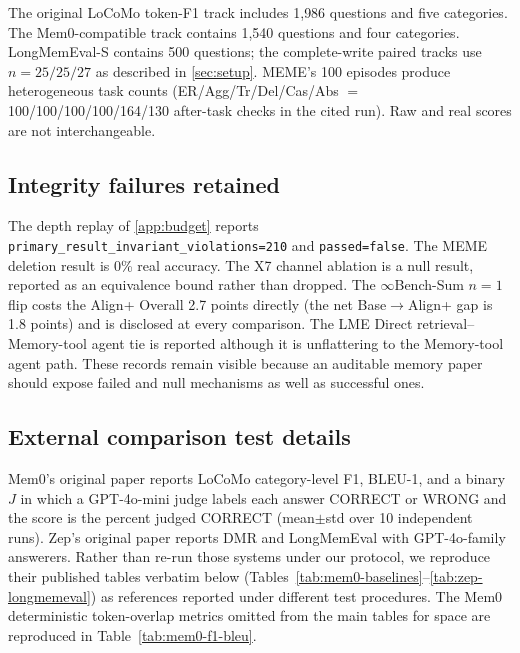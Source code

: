 The original LoCoMo token-F1 track includes 1{,}986 questions and five categories. The Mem0-compatible track contains 1{,}540 questions and four categories. LongMemEval-S contains 500 questions; the complete-write paired tracks use $n{=}25/25/27$ as described in \cref{sec:setup}. MEME's 100 episodes produce heterogeneous task counts (ER/Agg/Tr/Del/Cas/Abs $=$ 100/100/100/100/164/130 after-task checks in the cited run). Raw and real scores are not interchangeable.

\subsection{Integrity failures retained}

The depth replay of \cref{app:budget} reports \texttt{primary\_result\_invariant\_violations=210} and \texttt{passed=false}. The MEME deletion result is 0\% real accuracy. The X7 channel ablation is a null result, reported as an equivalence bound rather than dropped. The $\infty$Bench-Sum $n{=}1$ flip costs the Align+ Overall 2.7 points directly (the net Base$\to$Align+ gap is 1.8 points) and is disclosed at every comparison. The LME Direct retrieval--Memory-tool agent tie is reported although it is unflattering to the Memory-tool agent path. These records remain visible because an auditable memory paper should expose failed and null mechanisms as well as successful ones.

\subsection{External comparison test details}
\label{sec:published-baselines}

Mem0's original paper reports LoCoMo category-level F1, BLEU-1, and a binary $J$ in which a GPT-4o-mini judge labels each answer CORRECT or WRONG and the score is the percent judged CORRECT (mean$\pm$std over 10 independent runs). Zep's original paper reports DMR and LongMemEval with GPT-4o-family answerers. Rather than re-run those systems under our protocol, we reproduce their published tables verbatim below (Tables~\ref{tab:mem0-baselines}--\ref{tab:zep-longmemeval}) as references reported under different test procedures. The Mem0 deterministic token-overlap metrics omitted from the main tables for space are reproduced in Table~\ref{tab:mem0-f1-bleu}.



